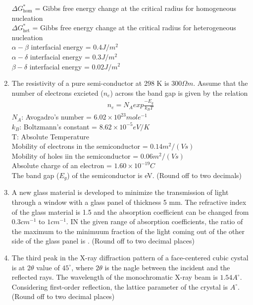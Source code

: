 \documentclass[journal,,12pt,onecolumn]{IEEEtran}
\theoremstyle{remark}
\begin{document}
\begin{enumerate}
\begin{figure}[H]
\end{figure}
$\Delta G^*_{\text{hom}}$ = Gibbs free energy change at the critical radius for homogeneous nucleation \\
$\Delta G^*_{\text{het}}$ = Gibbs free energy change at the critical radius for heterogeneous nucleation \\
$\alpha-\beta$ interfacial energy = $0.4 J/m^2$ \\
$\alpha-\delta$ interfacial energy = $0.3 J/m^2$ \\
$\beta-\delta$ interfacial energy = $0.02 J/m^2$ \\

\bigskip
\item The resistivity of a pure semi-conductor at 298 K is $300\Omega m$. Assume that the number of electrons excieted ($n_e$) across the band gap is given by the relation 
\begin{align*}
    n_{e}=N_{A} exp\frac{-E_{g}}{k_B T}
\end{align*}
$N_{A}$: Avogadro's number = $6.02\times 10^{23}mole^{-1}$\\
$k_B$: Boltzmann's constant = $8.62\times 10^{-5} eV/K$\\
T: Absolute Temperature \\
Mobility of electrons in the semiconductor = $0.14 m^2/(V s)$\\
Mobility of holes iin the semiconductor = $0.06 m^2/(V s)$\\
Absolute charge of an electron = $1.60\times10^{-19}C$\\
The band gap ($E_g$) of the semiconductor is \underline{\hspace{1cm}} eV. (Round off to two decimals)
\bigskip
\item A new glass material is developed to minimize the transmission of light through a window with a glass panel of thickness 5 mm. The refractive index of the glass material is 1.5 and the absorption coefficient can be changed from $0.3cm^{-1}$ to $1cm^{-1}$. IN the given range of absorption coefficients, the ratio of the maximum to the minimuum fraction of the light coming out of the other side of the glass panel is \underline{\hspace{1cm}}. (Round off to two decimal places)
\bigskip
\item The third peak in the X-ray diffraction pattern of a face-centered cubic cystal is at $2\theta$ value of $45^\circ$, where $2\theta$ is the nagle between the incident and the reflected rays. The wavelength of the monochromatic X-ray beam is $1.54 A^\circ$. Considering first-order reflection, the lattice parameter of the crystal is \underline{\hspace{1cm}}$A^\circ$. (Round off to two decimal places)
\end{enumerate}
\end{document}

